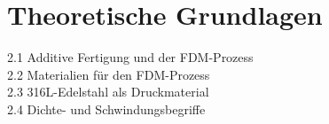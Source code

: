 \chapter{Theoretische Grundlagen}

2.1 Additive Fertigung und der FDM-Prozess\\

2.2 Materialien für den FDM-Prozess\\
2.3 316L-Edelstahl als Druckmaterial\\
2.4 Dichte- und Schwindungsbegriffe\\
